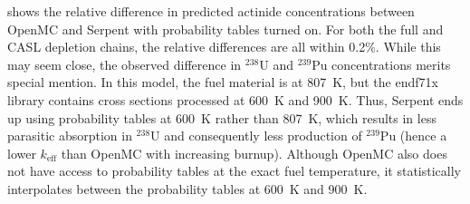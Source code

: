 \documentclass[3p,authoryear]{elsarticle}
\begin{document}
 shows the relative difference in predicted actinide
concentrations between OpenMC and Serpent with probability tables turned on. For
both the full and CASL depletion chains, the relative differences are all within
0.2\%. While this may seem close, the observed difference in $^{238}$U and
$^{239}$Pu concentrations merits special mention. In this model, the fuel
material is at \SI{807}{\kelvin}, but the endf71x library contains cross
sections processed at \SI{600}{\kelvin} and \SI{900}{\kelvin}. Thus, Serpent
ends up using probability tables at \SI{600}{\kelvin} rather than
\SI{807}{\kelvin}, which results in less parasitic absorption in $^{238}$U and
consequently less production of $^{239}$Pu (hence a lower $k_\text{eff}$ than
OpenMC with increasing burnup). Although OpenMC also does not have access to
probability tables at the exact fuel temperature, it statistically interpolates
between the probability tables at \SI{600}{\kelvin} and \SI{900}{\kelvin}.
\end{document}
